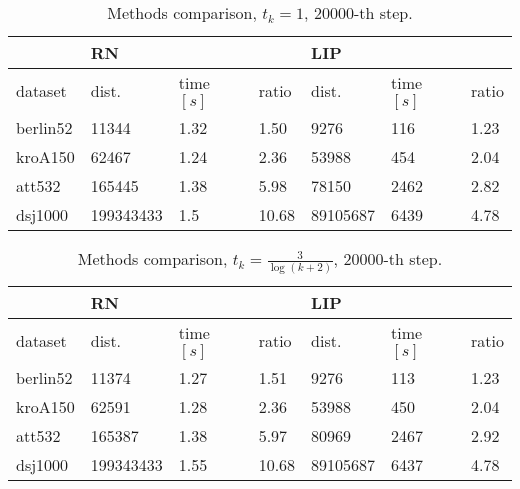 \begin{table}[!htb]
	\centering
	\begin{tabular}{l|lll|lll|}
		\cline{2-7}
		& \multicolumn{3}{l|}{RN}                                        & \multicolumn{3}{l|}{LIP}                                          \\ \hline
		\multicolumn{1}{|l|}{dataset}  & \multicolumn{1}{l|}{dist.}     & \multicolumn{1}{l|}{time $[s]$} & ratio & \multicolumn{1}{l|}{dist.}    & \multicolumn{1}{l|}{time $[s]$} & ratio \\ \hline
		\multicolumn{1}{|l|}{berlin52} & \multicolumn{1}{l|}{11344}     & \multicolumn{1}{l|}{1.32} & 1.50  & \multicolumn{1}{l|}{9276}     & \multicolumn{1}{l|}{116}  & 1.23  \\ \hline
		\multicolumn{1}{|l|}{kroA150}  & \multicolumn{1}{l|}{62467}     & \multicolumn{1}{l|}{1.24} & 2.36  & \multicolumn{1}{l|}{53988}    & \multicolumn{1}{l|}{454}  & 2.04  \\ \hline
		\multicolumn{1}{|l|}{att532}   & \multicolumn{1}{l|}{165445}    & \multicolumn{1}{l|}{1.38} & 5.98  & \multicolumn{1}{l|}{78150}    & \multicolumn{1}{l|}{2462} & 2.82  \\ \hline
		\multicolumn{1}{|l|}{dsj1000}  & \multicolumn{1}{l|}{199343433} & \multicolumn{1}{l|}{1.5}  & 10.68 & \multicolumn{1}{l|}{89105687} & \multicolumn{1}{l|}{6439} & 4.78  \\ \hline
	\end{tabular}
	\caption{Methods comparison, $t_k=1$, 20000-th step.}
	\label{tab:results_comp_cool=1}
\end{table}

\begin{table}[!htb]
	\centering
	\begin{tabular}{l|lll|lll|}
		\cline{2-7}
		& \multicolumn{3}{l|}{RN}                                        & \multicolumn{3}{l|}{LIP}                                          \\ \hline
		\multicolumn{1}{|l|}{dataset}  & \multicolumn{1}{l|}{dist.}     & \multicolumn{1}{l|}{time $[s]$} & ratio & \multicolumn{1}{l|}{dist.}    & \multicolumn{1}{l|}{time $[s]$} & ratio \\ \hline
		\multicolumn{1}{|l|}{berlin52} & \multicolumn{1}{l|}{11374}     & \multicolumn{1}{l|}{1.27} & 1.51  & \multicolumn{1}{l|}{9276}     & \multicolumn{1}{l|}{113}  & 1.23  \\ \hline
		\multicolumn{1}{|l|}{kroA150}  & \multicolumn{1}{l|}{62591}     & \multicolumn{1}{l|}{1.28} & 2.36  & \multicolumn{1}{l|}{53988}    & \multicolumn{1}{l|}{450}  & 2.04  \\ \hline
		\multicolumn{1}{|l|}{att532}   & \multicolumn{1}{l|}{165387}    & \multicolumn{1}{l|}{1.38} & 5.97  & \multicolumn{1}{l|}{80969}    & \multicolumn{1}{l|}{2467} & 2.92  \\ \hline
		\multicolumn{1}{|l|}{dsj1000}  & \multicolumn{1}{l|}{199343433} & \multicolumn{1}{l|}{1.55} & 10.68 & \multicolumn{1}{l|}{89105687} & \multicolumn{1}{l|}{6437} & 4.78  \\ \hline
	\end{tabular}
	\caption{Methods comparison, $t_k=\frac{3}{\log(k+2)}$, 20000-th step.}
	\label{tab:results_comp_cool=2.73}
\end{table}